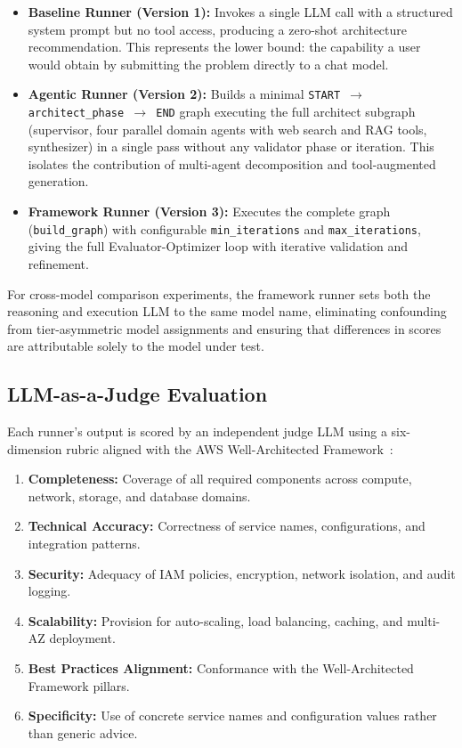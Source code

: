 \begin{itemize}
    \item \textbf{Baseline Runner (Version 1):} Invokes a single LLM call with a structured system prompt but no tool access, producing a zero-shot architecture recommendation. This represents the lower bound: the capability a user would obtain by submitting the problem directly to a chat model.
    \item \textbf{Agentic Runner (Version 2):} Builds a minimal \texttt{START $\rightarrow$ architect\_phase $\rightarrow$ END} graph executing the full architect subgraph (supervisor, four parallel domain agents with web search and RAG tools, synthesizer) in a single pass without any validator phase or iteration. This isolates the contribution of multi-agent decomposition and tool-augmented generation.
    \item \textbf{Framework Runner (Version 3):} Executes the complete graph (\texttt{build\_graph}) with configurable \texttt{min\_iterations} and \texttt{max\_iterations}, giving the full Evaluator-Optimizer loop with iterative validation and refinement.
\end{itemize}

For cross-model comparison experiments, the framework runner sets both the reasoning and execution LLM to the same model name, eliminating confounding from tier-asymmetric model assignments and ensuring that differences in scores are attributable solely to the model under test.

\subsection{LLM-as-a-Judge Evaluation}

Each runner's output is scored by an independent judge LLM using a six-dimension rubric aligned with the AWS Well-Architected Framework~\cite{aws2023wellarchitected}:

\begin{enumerate}
    \item \textbf{Completeness:} Coverage of all required components across compute, network, storage, and database domains.
    \item \textbf{Technical Accuracy:} Correctness of service names, configurations, and integration patterns.
    \item \textbf{Security:} Adequacy of IAM policies, encryption, network isolation, and audit logging.
    \item \textbf{Scalability:} Provision for auto-scaling, load balancing, caching, and multi-AZ deployment.
    \item \textbf{Best Practices Alignment:} Conformance with the Well-Architected Framework pillars.
    \item \textbf{Specificity:} Use of concrete service names and configuration values rather than generic advice.
\end{enumerate}

